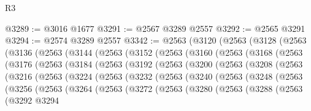 \begin{lexlean}{R3}
\begin{coremodule}
@3289 := @3016 @1677
@3291 := @2567 @3289 @2557
@3292 := @2565 @3291
@3294 := @2574 @3289 @2557
@3342 := @2563
    (@3120
      (@2563
        (@3128
          (@2563
            (@3136
              (@2563
                (@3144
                  (@2563
                    (@3152
                      (@2563
                        (@3160
                          (@2563
                            (@3168
                              (@2563
                                (@3176
                                  (@2563
                                    (@3184
                                      (@2563
                                        (@3192
                                          (@2563
                                            (@3200
                                              (@2563
                                                (@3208
                                                  (@2563
                                                    (@3216
                                                      (@2563
                                                        (@3224
                                                          (@2563
                                                            (@3232
                                                              (@2563
                                                                (@3240
                                                                  (@2563
                                                                    (@3248
                                                                      (@2563
                                                                        (@3256
                                                                          (@2563
                                                                            (@3264
                                                                              (@2563
                                                                                (@3272
                                                                                  (@2563
                                                                                    (@3280
                                                                                      (@2563
                                                                                        (@3288
                                                                                          (@2563
                                                                                            (@3292
                                                                                              @3294

\end{coremodule}
\end{lexlean}
